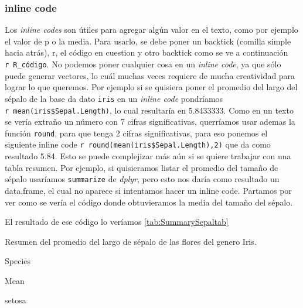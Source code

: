 \documentclass[]{book}
\newenvironment{Shaded}{\begin{snugshade}}{\end{snugshade}}
\newcommand{\DataTypeTok}[1]{\textcolor[rgb]{0.13,0.29,0.53}{#1}}
\newcommand{\KeywordTok}[1]{\textcolor[rgb]{0.13,0.29,0.53}{\textbf{#1}}}
\newcommand{\NormalTok}[1]{#1}
\newcommand{\OperatorTok}[1]{\textcolor[rgb]{0.81,0.36,0.00}{\textbf{#1}}}
\newcommand{\StringTok}[1]{\textcolor[rgb]{0.31,0.60,0.02}{#1}}
\begin{document}
\hypertarget{inline-code}{%
\subsubsection{inline code}\label{inline-code}}

Los \emph{inline codes} son útiles para agregar algún valor en el texto,
como por ejemplo el valor de p o la media. Para usarlo, se debe poner un
backtick (comilla simple hacia atrás), r, el código en cuestion y otro
backtick como se ve a continuación
\texttt{\textasciigrave{}r\ R\_código\textasciigrave{}}. No podemos
poner cualquier cosa en un \emph{inline code}, ya que sólo puede generar
vectores, lo cuál muchas veces requiere de mucha creatividad para lograr
lo que queremos. Por ejemplo si se quisiera poner el promedio del largo
del sépalo de la base da dato \texttt{iris} en un \emph{inline code}
pondríamos
\texttt{\textasciigrave{}r\ mean(iris\$Sepal.Length)\textasciigrave{}},
lo cual resultaría en 5.8433333. Como en un texto se vería extraño un
número con 7 cifras significativas, querríamos usar ademas la función
\texttt{round}, para que tenga 2 cifras significativas, para eso ponemos
el siguiente inline code
\texttt{\textasciigrave{}r\ round(mean(iris\$Sepal.Length),2)\textasciigrave{}}
que da como resultado 5.84. Esto se puede complejizar más aún si se
quiere trabajar con una tabla resumen. Por ejemplo, si quisieramos
listar el promedio del tamaño de sépalo usaríamos \texttt{summarize} de
\emph{dplyr}, pero esto nos daría como resultado un data.frame, el cual
no aparece si intentamos hacer un inline code. Partamos por ver como se
vería el código donde obtuvieramos la media del tamaño del sépalo.

\begin{Shaded}
\end{Shaded}

El resultado de ese código lo veríamos \ref{tab:SummarySepaltab}

\label{tab:SummarySepaltab}Resumen del promedio del largo de sépalo de las
flores del genero Iris.

Species

Mean

setosa
\end{document}
